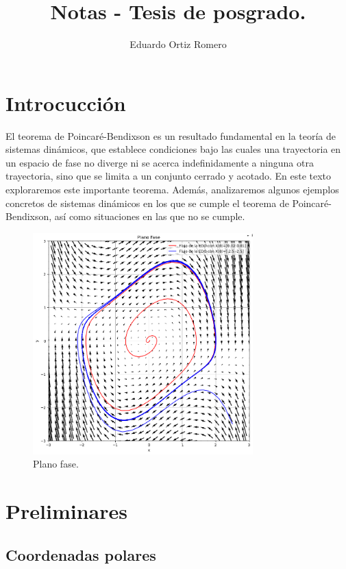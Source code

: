 \documentclass[12pt, a4paper]{report}
\title{Notas - Tesis de posgrado.}
\author{Eduardo Ortiz Romero}
\begin{document}
\maketitle
\tableofcontents

\chapter*{Introcucción}

El teorema de Poincaré-Bendixson es un resultado 
fundamental en la teoría de sistemas dinámicos,
que establece condiciones bajo las cuales una trayectoria en 
un espacio de fase no diverge ni se
acerca indefinidamente a ninguna otra trayectoria, sino que 
se limita a un conjunto cerrado y
acotado. En este texto exploraremos este importante teorema.
Además, analizaremos algunos ejemplos concretos de sistemas 
dinámicos en los que se cumple
el teorema de Poincaré-Bendixson, así como situaciones en 
las que no se cumple.\\

\begin{figure}[h]
	\centering
	\includegraphics[width=8.5cm]{portada.png}
	\caption{Plano fase.}
\end{figure}

\newpage

\chapter{Preliminares}

\section{Coordenadas polares}
\end{document}
